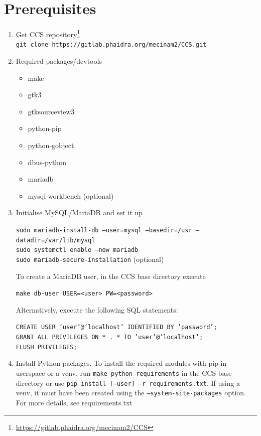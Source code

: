 \section{Prerequisites}
\begin{enumerate}
\item Get CCS repository\footnote{\href{https://gitlab.phaidra.org/mecinam2/CCS}{https://gitlab.phaidra.org/mecinam2/CCS}}\vspace{5pt}\\
\texttt{git clone https://gitlab.phaidra.org/mecinam2/CCS.git}
    
\item Required packages/devtools
\begin{itemize}
  \item make
  \item gtk3
  \item gtksourceview3
  \item python-pip
  \item python-gobject
  \item dbus-python
  \item mariadb
  \item mysql-workbench (optional)
\end{itemize}

\item Initialise MySQL/MariaDB and set it up

\texttt{sudo mariadb-install-db --user=mysql --basedir=/usr --datadir=/var/lib/mysql}\\
\texttt{sudo systemctl enable --now mariadb}\\
\texttt{sudo mariadb-secure-installation}  (optional)

    To create a MariaDB user, in the CCS base directory execute
    
	\texttt{make db-user USER=<user> PW=<password>}

    Alternatively, execute the following SQL statements:
    
	\texttt{CREATE USER 'user'@'localhost' IDENTIFIED BY 'password';}\\
	\texttt{GRANT ALL PRIVILEGES ON * . * TO 'user'@'localhost';}\\
	\texttt{FLUSH PRIVILEGES;}
    
\item {Install Python packages. To install the required modules with pip in userspace or a venv, run
   \texttt{make python-requirements} in the CCS base directory or use \texttt{pip install [--user] -r requirements.txt}.
   If using a venv, it must have been created using the \texttt{--system-site-packages} option.
   For more details, see requirements.txt}
\end{enumerate}

